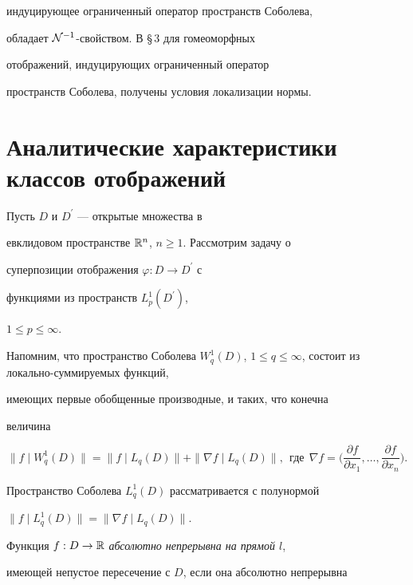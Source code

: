 индуцирующее ограниченный оператор пространств Соболева,


обладает ${\cal N}^{-1}$-свойством. В \S\,3 для гомеоморфных


отображений, индуцирующих ограниченный оператор


пространств Соболева, получены условия локализации нормы.








\section{Аналитические характеристики классов отображений}





Пусть $D$ и $D^{\prime}$ --- открытые множества в


евклидовом пространстве ${\Bbb R}^n$, $n\ge1$. Рассмотрим задачу о


суперпозиции отображения $\varphi:D\to D^{\prime}$ с


функциями из пространств $L^1_p(D^{\prime})$,


$1\leq p\leq\infty$.





Напомним, что пространство Соболева $W^1_q(D)$, $1\leq


q\leq\infty$, состоит из локально-суммируемых функций,


имеющих первые обобщенные производные, и таких, что конечна


величина


$$


\|f\mid W^1_q(D)\|= \|f\mid L_q(D)\|+\|\nabla f\mid


L_q(D)\|, \ \ \text{где}\ \ \nabla f=\bigg(\frac{\partial


f}{\partial x_1},\dotsc,\frac{\partial f}{\partial x_n}\bigg).


$$


Пространство Соболева $L^1_q(D)$ рассматривается с полунормой


$\|f\mid L^1_q(D)\|=\|\nabla f\mid L_q(D)\|$.





Функция $f:D\to {\Bbb R}$ {\it абсолютно непрерывна на прямой $l$},


имеющей непустое пересечение с $D$, если она абсолютно непрерывна


